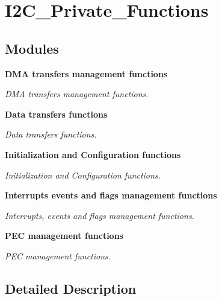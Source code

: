 \section{I2\+C\+\_\+\+Private\+\_\+\+Functions}
\label{group__I2C__Private__Functions}
\subsection*{Modules}
\begin{DoxyCompactItemize}
\item 
\textbf{ D\+M\+A transfers management functions}
\begin{DoxyCompactList}\small\item\em D\+MA transfers management functions. \end{DoxyCompactList}\item 
\textbf{ Data transfers functions}
\begin{DoxyCompactList}\small\item\em Data transfers functions. \end{DoxyCompactList}\item 
\textbf{ Initialization and Configuration functions}
\begin{DoxyCompactList}\small\item\em Initialization and Configuration functions. \end{DoxyCompactList}\item 
\textbf{ Interrupts events and flags management functions}
\begin{DoxyCompactList}\small\item\em Interrupts, events and flags management functions. \end{DoxyCompactList}\item 
\textbf{ P\+E\+C management functions}
\begin{DoxyCompactList}\small\item\em P\+EC management functions. \end{DoxyCompactList}\end{DoxyCompactItemize}


\subsection{Detailed Description}
